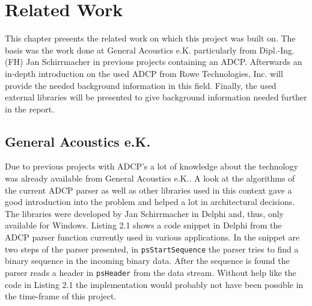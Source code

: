 \chapter{Related Work}
This chapter presents the related work on which this project was built on. The basis was the work done at General Acoustics e.K. particularly from Dipl.-Ing. (FH) Jan Schirrmacher in previous projects containing an ADCP. Afterwards an in-depth introduction on the used ADCP from Rowe Technologies, Inc.\cite{rowe} will provide the needed background information in this field. Finally, the used external libraries will be presented to give background information needed further in the report.

\section{General Acoustics e.K.}
Due to previous projects with ADCP's a lot of knowledge about the technology was already available from General Acoustics e.K.. A look at the algorithms of the current ADCP parser as well as other libraries used in this context gave a good introduction into the problem and helped a lot in architectural decisions. The libraries were developed by Jan Schirrmacher in Delphi and, thus, only available for Windows. Listing 2.1 shows a code snippet in Delphi from the ADCP parser function currently used in various applications. In the snippet are two steps of the parser presented, in \texttt{psStartSequence} the parser tries to find a binary sequence in the incoming binary data. After the sequence is found the parser reads a header in \texttt{psHeader} from the data stream. Without help like the code in Listing 2.1 the implementation would probably not have been possible in the time-frame of this project.

